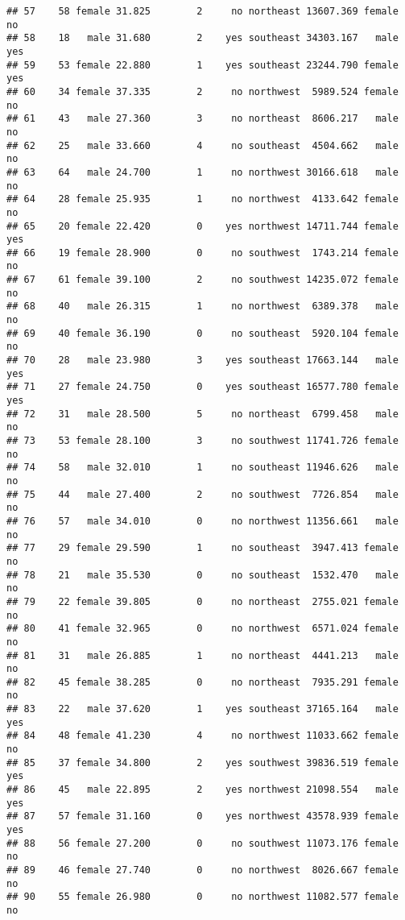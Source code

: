 \documentclass[
]{article}
\begin{document}
\begin{verbatim}
## 57    58 female 31.825        2     no northeast 13607.369 female       no
## 58    18   male 31.680        2    yes southeast 34303.167   male      yes
## 59    53 female 22.880        1    yes southeast 23244.790 female      yes
## 60    34 female 37.335        2     no northwest  5989.524 female       no
## 61    43   male 27.360        3     no northeast  8606.217   male       no
## 62    25   male 33.660        4     no southeast  4504.662   male       no
## 63    64   male 24.700        1     no northwest 30166.618   male       no
## 64    28 female 25.935        1     no northwest  4133.642 female       no
## 65    20 female 22.420        0    yes northwest 14711.744 female      yes
## 66    19 female 28.900        0     no southwest  1743.214 female       no
## 67    61 female 39.100        2     no southwest 14235.072 female       no
## 68    40   male 26.315        1     no northwest  6389.378   male       no
## 69    40 female 36.190        0     no southeast  5920.104 female       no
## 70    28   male 23.980        3    yes southeast 17663.144   male      yes
## 71    27 female 24.750        0    yes southeast 16577.780 female      yes
## 72    31   male 28.500        5     no northeast  6799.458   male       no
## 73    53 female 28.100        3     no southwest 11741.726 female       no
## 74    58   male 32.010        1     no southeast 11946.626   male       no
## 75    44   male 27.400        2     no southwest  7726.854   male       no
## 76    57   male 34.010        0     no northwest 11356.661   male       no
## 77    29 female 29.590        1     no southeast  3947.413 female       no
## 78    21   male 35.530        0     no southeast  1532.470   male       no
## 79    22 female 39.805        0     no northeast  2755.021 female       no
## 80    41 female 32.965        0     no northwest  6571.024 female       no
## 81    31   male 26.885        1     no northeast  4441.213   male       no
## 82    45 female 38.285        0     no northeast  7935.291 female       no
## 83    22   male 37.620        1    yes southeast 37165.164   male      yes
## 84    48 female 41.230        4     no northwest 11033.662 female       no
## 85    37 female 34.800        2    yes southwest 39836.519 female      yes
## 86    45   male 22.895        2    yes northwest 21098.554   male      yes
## 87    57 female 31.160        0    yes northwest 43578.939 female      yes
## 88    56 female 27.200        0     no southwest 11073.176 female       no
## 89    46 female 27.740        0     no northwest  8026.667 female       no
## 90    55 female 26.980        0     no northwest 11082.577 female       no

\end{verbatim}
\end{document}
